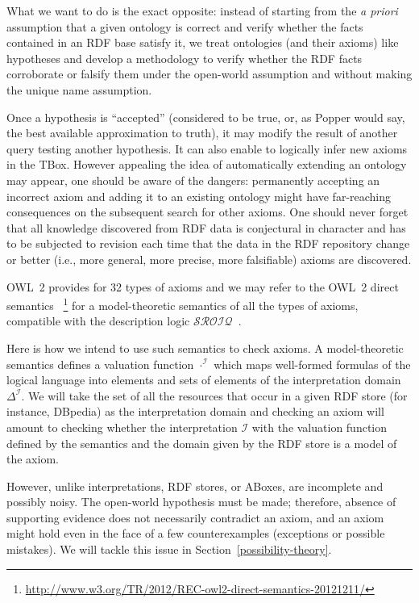 \documentclass[a4paper]{article}
\newcounter{ex}
\begin{document}
What we want to do is the exact opposite: instead of starting from the \emph{a priori}
assumption that a given ontology is correct and verify whether the facts contained
in an RDF base satisfy it, we treat ontologies (and their axioms) like hypotheses and develop
a methodology to verify whether the RDF facts corroborate or falsify them under the
open-world assumption and without making the unique name assumption.

Once a hypothesis is ``accepted'' (considered to be true, or, as Popper would say, the best
available approximation to truth),
it may modify the result of another query testing another hypothesis.
It can also enable to logically infer new axioms in the TBox.
However appealing the idea of automatically extending an ontology may appear,
one should be aware of the dangers: permanently accepting an incorrect axiom and adding
it to an existing ontology might have far-reaching consequences on the subsequent search
for other axioms. One should never forget that all knowledge discovered from RDF data
is conjectural in character and has to be subjected to revision each time that the data
in the RDF repository change or better (i.e., more general, more precise, more falsifiable)
axioms are discovered.

OWL~2 provides for 32 types of axioms and
we may refer to the OWL~2 direct semantics~\cite{OWL2-direct-semantics}
\footnote{\url{http://www.w3.org/TR/2012/REC-owl2-direct-semantics-20121211/}}
for a model-theoretic semantics of all the types of axioms, compatible with
the description logic $\mathcal{SROIQ}$~\cite{HorrocksKutzSattler2006}.

Here is how we intend to use such semantics to check axioms.
A model-theoretic semantics defines a valuation function
$\cdot^\mathcal{I}$ which maps well-formed formulas of the logical language into
elements and sets of elements of the interpretation domain $\Delta^\mathcal{I}$.
We will take the set of all the resources that occur in a given RDF store
(for instance, DBpedia) as the interpretation domain and checking an axiom
will amount to checking whether the interpretation $\mathcal{I}$ with the
valuation function defined by the semantics and the domain given by the
RDF store is a model of the axiom.

However, unlike interpretations, RDF stores, or ABoxes, are incomplete and
possibly noisy. The open-world hypothesis must be made; therefore, absence of
supporting evidence does not necessarily contradict an axiom, and an axiom might
hold even in the face of a few counterexamples (exceptions or possible mistakes).
We will tackle this issue in Section~\ref{possibility-theory}.
\end{document}
